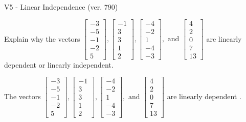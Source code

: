 \begin{exercise}
  \begin{exerciseTitle}V5 - Linear Independence (ver. 790)\end{exerciseTitle}
  \begin{exerciseStatement}
    Explain why the vectors \(\left[\begin{array}{r}
-3 \\
-5 \\
-1 \\
-2 \\
5
\end{array}\right] , \left[\begin{array}{r}
-1 \\
3 \\
3 \\
1 \\
2
\end{array}\right] , \left[\begin{array}{r}
-4 \\
-2 \\
1 \\
-4 \\
-3
\end{array}\right] , \text{ and } \left[\begin{array}{r}
4 \\
2 \\
0 \\
7 \\
13
\end{array}\right]\) are linearly dependent or linearly independent.	


  \end{exerciseStatement}
  \begin{exerciseAnswer}
   The vectors \(\left[\begin{array}{r}
-3 \\
-5 \\
-1 \\
-2 \\
5
\end{array}\right] , \left[\begin{array}{r}
-1 \\
3 \\
3 \\
1 \\
2
\end{array}\right] , \left[\begin{array}{r}
-4 \\
-2 \\
1 \\
-4 \\
-3
\end{array}\right] , \text{ and } \left[\begin{array}{r}
4 \\
2 \\
0 \\
7 \\
13
\end{array}\right]\) are 
  	 linearly dependent  .
  


  \end{exerciseAnswer}
\end{exercise}